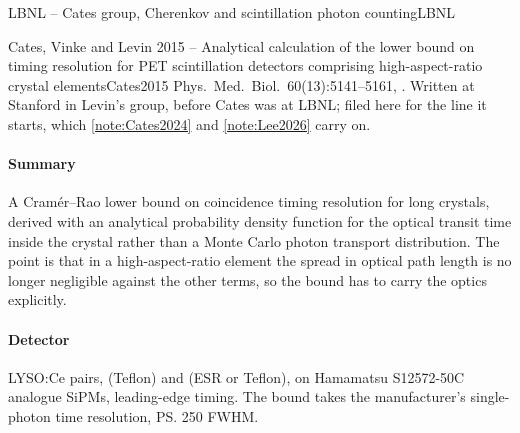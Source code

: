 \begin{programnote}{LBNL -- Cates group, Cherenkov and scintillation photon counting}{LBNL}
\begin{papernote}{Cates, Vinke and Levin 2015 -- Analytical calculation of the lower bound on timing resolution for PET scintillation detectors comprising high-aspect-ratio crystal elements}{Cates2015}
Phys.\ Med.\ Biol.\ 60(13):5141--5161, .
Written at Stanford in Levin's group, before Cates was at LBNL; filed here
for the line it starts, which \ref{note:Cates2024} and \ref{note:Lee2026}
carry on.

\paragraph{Summary}
A Cramér--Rao lower bound on coincidence timing resolution for long crystals,
derived with an analytical probability density function for the optical transit
time inside the crystal rather than a Monte Carlo photon transport
distribution. The point is that in a high-aspect-ratio element the spread in
optical path length is no longer negligible against the other terms, so the
bound has to carry the optics explicitly.

\paragraph{Detector}
LYSO:Ce pairs,  (Teflon) and
 (ESR or Teflon), on Hamamatsu
S12572-50C analogue SiPMs, leading-edge timing. The bound takes the
manufacturer's single-photon time resolution, \ps{250} FWHM.


\end{papernote}
\end{programnote}

